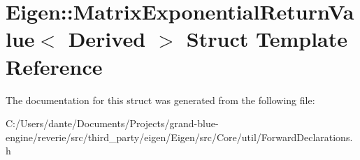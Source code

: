 \hypertarget{struct_eigen_1_1_matrix_exponential_return_value}{}\section{Eigen\+::Matrix\+Exponential\+Return\+Value$<$ Derived $>$ Struct Template Reference}
\label{struct_eigen_1_1_matrix_exponential_return_value}


The documentation for this struct was generated from the following file\+:\begin{DoxyCompactItemize}
\item 
C\+:/\+Users/dante/\+Documents/\+Projects/grand-\/blue-\/engine/reverie/src/third\+\_\+party/eigen/\+Eigen/src/\+Core/util/Forward\+Declarations.\+h\end{DoxyCompactItemize}
